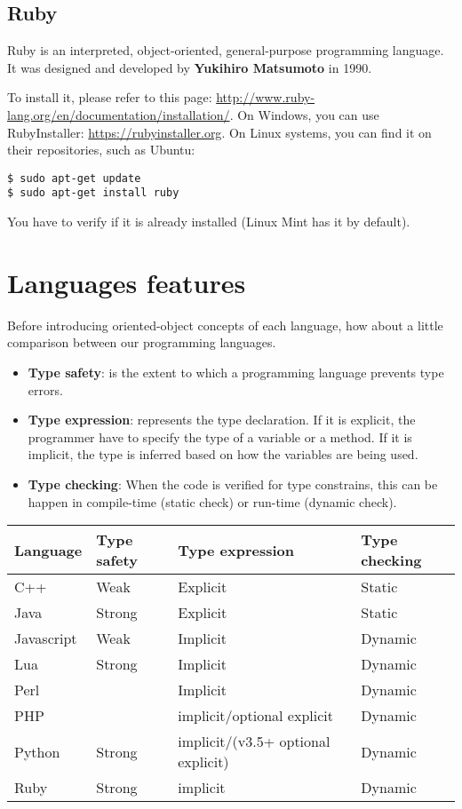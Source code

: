 \documentclass{KodeBook}
\begin{document}
\subsection{Ruby}

Ruby is an interpreted, object-oriented, general-purpose programming language. 
It was designed and developed by \textbf{Yukihiro Matsumoto} in 1990.

To install it, please refer to this page: \url{http://www.ruby-lang.org/en/documentation/installation/}. 
On Windows, you can use RubyInstaller: \url{https://rubyinstaller.org}.
On Linux systems, you can find it on their repositories, such as Ubuntu:
\begin{lstlisting}[style=shellStyle]
$ sudo apt-get update
$ sudo apt-get install ruby
\end{lstlisting}
You have to verify if it is already installed (Linux Mint has it by default).


\section{Languages features}

Before introducing oriented-object concepts of each language, how about a little comparison between our programming languages.

\begin{itemize}
	\item \textbf{Type safety}: is the extent to which a programming language prevents type errors. 
	\item \textbf{Type expression}: represents the type declaration. If it is explicit, the programmer have to specify the type of a variable or a method. If it is implicit, the type is inferred based on how the variables are being used.
	\item \textbf{Type checking}: When the code is verified for type constrains, this can be happen in compile-time (static check) or run-time (dynamic check).
\end{itemize}


\begin{table}
	\begin{tabular}{llll}
		\hline
		Language & Type safety & Type expression & Type checking \\
		\hline
		C++ & Weak & Explicit & Static \\
		\hline
		Java & Strong & Explicit & Static \\
		\hline
		Javascript & Weak & Implicit & Dynamic \\
		\hline
		Lua & Strong & Implicit & Dynamic \\
		\hline
		Perl & & Implicit & Dynamic \\
		\hline
		PHP & & implicit/optional explicit & Dynamic \\
		\hline
		Python & Strong & implicit/(v3.5+ optional explicit) & Dynamic \\
		\hline
		Ruby & Strong & implicit & Dynamic \\
		\hline
	\end{tabular}
\end{table}
\end{document}
